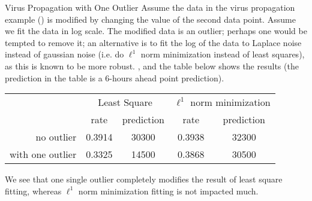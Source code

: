 \begin{figure}[htbp]
\begin{center}
\end{center}
\label{fig-laplace-expoGro-GL} 
\end{figure}
\begin{ex}{Virus Propagation with One Outlier}
Assume the data in the virus propagation example
() is modified by changing
the value of the second data point. Assume we fit
the data in log scale. The modified data is an
outlier; perhaps one would be tempted to remove
it; an alternative is to fit the log of the data
to Laplace noise instead of gaussian noise (i.e.
do $\ell^1$ norm minimization instead of least
squares), as this is known to be more robust.
, and the table
below shows the results (the prediction in the
table is a 6-hours ahead point prediction).

\vspace{0.7cm}
 \begin{tabular}{|r|c|c|c|c|}
   \hline
    & \multicolumn{2}{c|}{Least Square } & \multicolumn{2}{c|}{$\ell^1$ norm minimization}
    \\
    \cline{2-5}
    & rate   &  prediction & rate &   prediction \\
     \hline \hline
   no outlier & 0.3914  &     30300 & 0.3938 &    32300 \\
   \hline
   with one outlier&0.3325  &   14500 & 0.3868 &
   30500\\
   \hline
 \end{tabular}
\vspace{0.7cm}

We see that one single outlier completely
modifies the result of least square fitting,
whereas $\ell^1$ norm minimization fitting is not
impacted much.
\end{ex}

